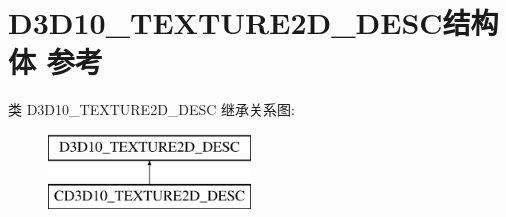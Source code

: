 \hypertarget{struct_d3_d10___t_e_x_t_u_r_e2_d___d_e_s_c}{}\section{D3\+D10\+\_\+\+T\+E\+X\+T\+U\+R\+E2\+D\+\_\+\+D\+E\+S\+C结构体 参考}
\label{struct_d3_d10___t_e_x_t_u_r_e2_d___d_e_s_c}
类 D3\+D10\+\_\+\+T\+E\+X\+T\+U\+R\+E2\+D\+\_\+\+D\+E\+SC 继承关系图\+:\begin{figure}[H]
\begin{center}
\leavevmode
\includegraphics[height=2.000000cm]{struct_d3_d10___t_e_x_t_u_r_e2_d___d_e_s_c}
\end{center}
\end{figure}
